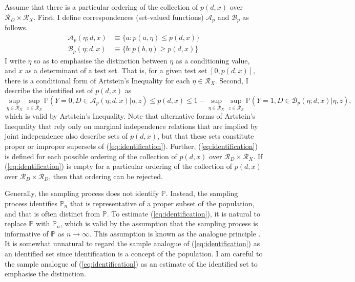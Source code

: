 \documentclass[12pt,a4paper,twoside]{article}
\numberwithin{equation}{section}
\newcommand{\Art}{Artstein's Inequality}
\begin{document}
Assume that there is a particular ordering of the collection of $p(d,x)$ over $\mathcal{R}_D\times\mathcal{R}_X$. First, I define correspondences (set-valued functions) $\mathcal{A}_p$ and $\mathcal{B}_p$ as follows.
\begin{align*}
\mathcal{A}_p(\eta;d,x)&\equiv\lbrace a : p(a,\eta)\leq p(d,x)\rbrace\\
\mathcal{B}_p(\eta;d,x)&\equiv\lbrace b : p(b,\eta)\geq p(d,x)\rbrace
\end{align*}
I write $\eta$ so as to emphasise the distinction between $\eta$ as a conditioning value, and $x$ as a determinant of a test set. That is, for a given test set $[0,p(d,x)]$, there is a conditional form of {\Art} for each $\eta\in\mathcal{R}_X$. Second, I describe the identified set of $p(d,x)$ as
\begin{equation}
\sup_{\eta\in\mathcal{R}_X}\sup_{z\in\mathcal{R}_Z}\mathbb{P}(Y=0,D\in\mathcal{A}_p(\eta;d,x)|\eta,z)\leq p(d,x)\leq 1-\sup_{\eta\in\mathcal{R}_X}\sup_{z\in\mathcal{R}_Z}\mathbb{P}(Y=1,D\in\mathcal{B}_p(\eta;d,x)|\eta,z),\label{eq:identification}
\end{equation}
which is valid by {\Art}. Note that alternative forms of {\Art} that rely only on marginal independence relations that are implied by joint independence also describe sets of $p(d,x)$, but that these sets constitute proper or improper supersets of (\ref{eq:identification}). Further, (\ref{eq:identification}) is defined for each possible ordering of the collection of $p(d,x)$ over $\mathcal{R}_D\times\mathcal{R}_X$. If (\ref{eq:identification}) is empty for a particular ordering of the collection of $p(d,x)$ over $\mathcal{R}_D\times\mathcal{R}_D$, then that ordering can be rejected. 

Generally, the sampling process does not identify $\mathbb{P}$. Instead, the sampling process identifies $\mathbb{P}_n$ that is representative of a proper subset of the population, and that is often distinct from $\mathbb{P}$. To estimate (\ref{eq:identification}), it is natural to replace $\mathbb{P}$ with $\mathbb{P}_n$, which is valid by the assumption that the sampling process is informative of $\mathbb{P}$ as $n\rightarrow\infty$. This assumption is known as the analogue principle \citep{book.analogue}. It is somewhat unnatural to regard the sample analogue of (\ref{eq:identification}) as an identified set since identification is a concept of the population. I am careful to the sample analogue of (\ref{eq:identification}) as an estimate of the identified set to emphasise the distinction.   
\end{document}
